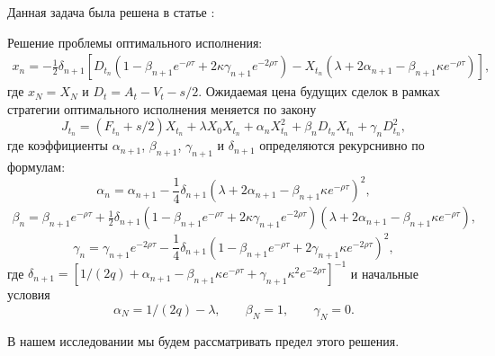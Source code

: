 Данная задача была решена в статье \cite{obizhaeva2013optimal}:
\begin{theorem}
    Решение проблемы оптимального исполнения:
    \begin{multline*}
        x_n = - \frac{1}{2} \delta_{n + 1} [D_{t_n} (1 - \beta_{n + 1} e^{ - \rho \tau} + 2 \kappa \gamma_{n+1} e^{ - 2 \rho \tau}) 
         - X_{t_n} (\lambda + 2 \alpha_{n+1} - \beta_{n+1}\kappa e^{ - \rho \tau}) ], 
    \end{multline*}
    где $x_N = X_N$ и $D_t = A_t - V_t - s/2$. Ожидаемая цена будущих сделок в рамках
    стратегии оптимального исполнения меняется по закону
    \begin{equation*}
        J_{t_n} = (F_{t_n} + s/2) X_{t_n} + \lambda X_0 X_{t_n} + \alpha_n X_{t_n} ^2 + \beta_{n} D_{t_n} X_{t_n} + \gamma_n D_{t_n}^2, 
    \end{equation*}
    где коэффициенты $\alpha_{n+1}$, $\beta_{n+1}$, $\gamma_{n+1}$ и $\delta_{n+1}$ определяются рекурснивно по формулам:
    \begin{equation*}
        \alpha_{n} = \alpha_{n+1} - \frac{1}{4} \delta _{n+1} (\lambda + 2 \alpha_{n+1} - \beta_{n+1} \kappa e^{- \rho \tau})^2, 
    \end{equation*}
    \begin{multline*}
        \beta_{n} =  \beta_{n+1} e^{- \rho \tau} + \frac{1}{2} \delta _{n+1} (1 - \beta_{n+1} e^{- \rho \tau} 
         + 2 \kappa \gamma_{n+1} e^{- 2 \rho \tau}) (\lambda + 2 \alpha_{n+1} - \beta_{n+1} \kappa e^{-\rho \tau}), 
    \end{multline*}
    \begin{equation*}
         \gamma_n =   \gamma_{n+1} e^{- 2 \rho \tau} - \frac{1}{4} \delta _{n+1} (1 - \beta _{n+1} e^{- \rho \tau} 
    + 2 \gamma _{n+1} \kappa e^{- 2 \rho \tau})^2, 
    \end{equation*}
    где $\delta_{n+1} = [1/(2q) + \alpha_{n+1} - \beta_{n+1} \kappa e^{-\rho \tau} + \gamma _{n+1} \kappa ^2 e^{- 2 \rho \tau}]^{-1}$ и начальные условия
    \begin{equation*}
        \alpha_{N} = 1/(2q) - \lambda, \;\;\;\;\;\;\; \beta_N = 1, \;\;\;\;\;\;\; \gamma_N = 0.
    \end{equation*}
\end{theorem}

В нашем исследовании мы будем рассматривать предел этого решения.

